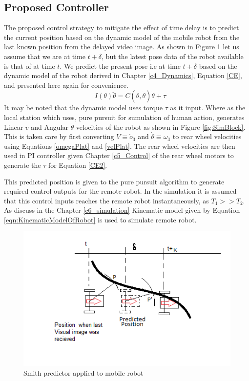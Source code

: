 \subsection{Proposed Controller}
The proposed control strategy to mitigate the effect of time delay is to predict the current position based on the dynamic model of the mobile robot from the last known position from the delayed video image.  As shown in Figure \ref{fig:SmithRobot} let us assume that we are at time $t+\delta$, but the latest pose  data of the robot available is that of at time $t$. We predict the present pose i.e at time $t+\delta$ based on the dynamic model  of the robot derived in Chapter \ref{c4_Dynamics}, Equation \ref{CE}, and presented here again for convenience. 
\begin{equation}
\label{CE2}
\quad I(\theta)\ddot{\theta}=C(\theta,\dot{\theta})\dot{\theta}+\tau
\end{equation}
It may be noted that the dynamic model uses torque $\tau$ as it input. Where as the local station which uses, pure pursuit for sumulation of  human action,   generates Linear  $v$ and Angular $\dot\theta$  velocities of the robot as shown in Figure \ref{fig:SimBlock}. This is taken care by first converting $V \equiv\dot o_3$ and $\dot\theta\equiv\omega_3$ to rear wheel velocities using Equations \ref{omegaPlat} and \ref{velPlat}. The rear wheel velocities  are then used in PI controller given Chapter \ref{c5_Control} of the rear wheel motors to generate the $\tau$ for Equation \ref{CE2}.

This predicted position is given to the pure pursuit algorithm to generate required control outputs for the remote robot. In the simulation it is assumed that this control inputs reaches the remote robot instantaneously, as $T_1>> T_2$. As discuss in the Chapter \ref{c6_simulation}   Kinematic model given by Equation \ref{eqn:KinematicModelOfRobot} is used to simulate remote robot.
 \begin{figure}
	\includegraphics{Chapter7/fig/robotPredictPos}
	\caption{Smith predictor applied to mobile robot}
	\label{fig:SmithRobot}
\end{figure}

